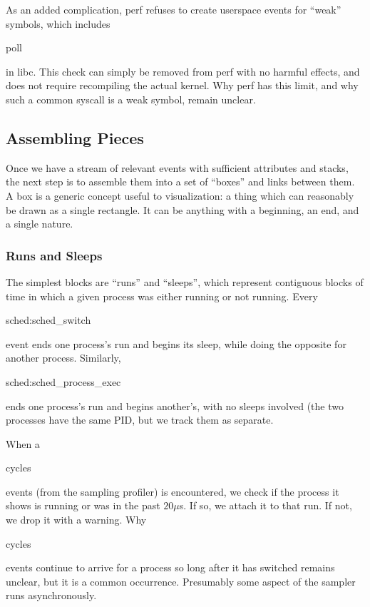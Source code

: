 \documentclass[10pt]{article}
\begin{document}
As an added complication, perf refuses to create userspace events for ``weak'' symbols, which includes \begin{tt}poll\end{tt} in libc.  This check can simply be removed from perf with no harmful effects, and does not require recompiling the actual kernel.  Why perf has this limit, and why such a common syscall is a weak symbol, remain unclear.

\subsection{Assembling Pieces}

Once we have a stream of relevant events with sufficient attributes and stacks, the next step is to assemble them into a set of ``boxes'' and links between them.  A box is a generic concept useful to visualization: a thing which can reasonably be drawn as a single rectangle.  It can be anything with a beginning, an end, and a single nature.

\subsubsection{Runs and Sleeps}

The simplest blocks are ``runs'' and ``sleeps'', which represent contiguous blocks of time in which a given process was either running or not running.  Every \begin{tt}sched:sched\_switch\end{tt} event ends one process's run and begins its sleep, while doing the opposite for another process.  Similarly, \begin{tt}sched:sched\_process\_exec\end{tt} ends one process's run and begins another's, with no sleeps involved (the two processes have the same PID, but we track them as separate.

When a \begin{tt}cycles\end{tt} events (from the sampling profiler) is encountered, we check if the process it shows is running or was in the past $20 \mu$s.  If so, we attach it to that run.  If not, we drop it with a warning.  Why \begin{tt}cycles\end{tt} events continue to arrive for a process so long after it has switched remains unclear, but it is a common occurrence.  Presumably some aspect of the sampler runs asynchronously.
\end{document}
